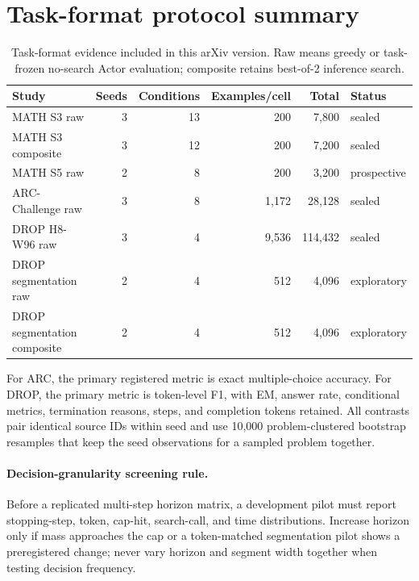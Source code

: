 \documentclass[10pt]{article}
\begin{document}
\section{Task-format protocol summary}\label{app:task-protocols}

\begin{table}[H]
  \caption{Task-format evidence included in this arXiv version.  Raw means greedy or
  task-frozen no-search Actor evaluation; composite retains best-of-2
  inference search.}
  \label{tab:cross-task-protocol}
  \centering
  \scriptsize
  \begin{tabular}{lrrrrl}
    \toprule
    Study & Seeds & Conditions & Examples/cell & Total & Status \\
    \midrule
    MATH S3 raw & 3 & 13 & 200 & 7,800 & sealed \\
    MATH S3 composite & 3 & 12 & 200 & 7,200 & sealed \\
    MATH S5 raw & 2 & 8 & 200 & 3,200 & prospective \\
    ARC-Challenge raw & 3 & 8 & 1,172 & 28,128 & sealed \\
    DROP H8-W96 raw & 3 & 4 & 9,536 & 114,432 & sealed \\
    DROP segmentation raw & 2 & 4 & 512 & 4,096 & exploratory \\
    DROP segmentation composite & 2 & 4 & 512 & 4,096 & exploratory \\
    \bottomrule
  \end{tabular}
\end{table}

For ARC, the primary registered metric is exact multiple-choice accuracy.  For
DROP, the primary metric is token-level F1, with EM, answer rate, conditional
metrics, termination reasons, steps, and completion tokens retained.  All
contrasts pair identical source IDs within seed and use 10,000 problem-clustered
bootstrap resamples that keep the seed observations for a sampled problem
together.

\enlargethispage{4\baselineskip}
\paragraph{Decision-granularity screening rule.} Before a replicated multi-step horizon matrix, a development pilot must report stopping-step, token, cap-hit, search-call, and time distributions. Increase horizon only if mass approaches the cap or a token-matched segmentation pilot shows a preregistered change; never vary horizon and segment width together when testing decision frequency.
\end{document}
